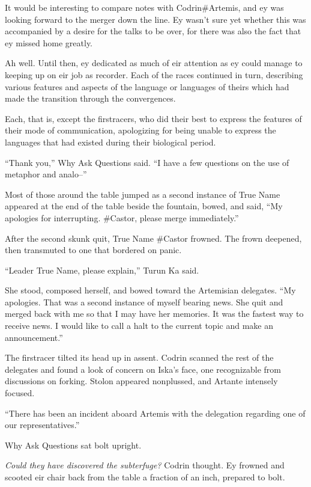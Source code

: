 It would be interesting to compare notes with Codrin\#Artemis, and ey was looking forward to the merger down the line. Ey wasn't sure yet whether this was accompanied by a desire for the talks to be over, for there was also the fact that ey missed home greatly.

Ah well. Until then, ey dedicated as much of eir attention as ey could manage to keeping up on eir job as recorder. Each of the races continued in turn, describing various features and aspects of the language or languages of theirs which had made the transition through the convergences.

Each, that is, except the firstracers, who did their best to express the features of their mode of communication, apologizing for being unable to express the languages that had existed during their biological period.

``Thank you,'' Why Ask Questions said. ``I have a few questions on the use of metaphor and analo--''

Most of those around the table jumped as a second instance of True Name appeared at the end of the table beside the fountain, bowed, and said, ``My apologies for interrupting. \#Castor, please merge immediately.''

After the second skunk quit, True Name \#Castor frowned. The frown deepened, then transmuted to one that bordered on panic.

``Leader True Name, please explain,'' Turun Ka said.

She stood, composed herself, and bowed toward the Artemisian delegates. ``My apologies. That was a second instance of myself bearing news. She quit and merged back with me so that I may have her memories. It was the fastest way to receive news. I would like to call a halt to the current topic and make an announcement.''

The firstracer tilted its head up in assent. Codrin scanned the rest of the delegates and found a look of concern on Iska's face, one recognizable from discussions on forking. Stolon appeared nonplussed, and Artante intensely focused.

``There has been an incident aboard Artemis with the delegation regarding one of our representatives.''

Why Ask Questions sat bolt upright.

\emph{Could they have discovered the subterfuge?} Codrin thought. Ey frowned and scooted eir chair back from the table a fraction of an inch, prepared to bolt.

